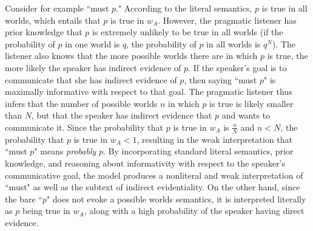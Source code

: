 \documentclass[12pt]{article}
\begin{document}
Consider for example ``must $p$." According to the literal semantics, $p$ is true in all worlds, which entails that $p$ is true in $w_A$. However, the pragmatic listener has prior knowledge that $p$ is extremely unlikely to be true in all worlds (if the probability of $p$ in one world is $q$, the probability of $p$ in all worlds is $q^N$). The listener also knows that the more possible worlds there are in which $p$ is true, the more likely the speaker has indirect evidence of $p$. If the speaker's goal is to communicate that she has indirect evidence of $p$, then saying ``must $p$" is maximally informative with respect to that goal. The pragmatic listener thus infers that the number of possible worlds $n$ in which $p$ is true is likely smaller than $N$, but that the speaker has indirect evidence that $p$ and wants to communicate it. Since the probability that $p$ is true in $w_A$ is $\frac{n}{N}$ and $n < N$, the probability that $p$ is true in $w_A < 1$, resulting in the weak interpretation that ``must $p$" means \emph{probably} $p$. By incorporating standard literal semantics, prior knowledge, and reasoning about informativity with respect to the speaker's communicative goal, the model produces a nonliteral and weak interpretation of ``must" as well as the subtext of indirect evidentiality. On the other hand, since the bare ``$p$" does not evoke a possible worlds semantics, it is interpreted literally as $p$ being true in $w_A$, along with a high probability of the speaker having direct evidence. 








\newpage



\end{document}
